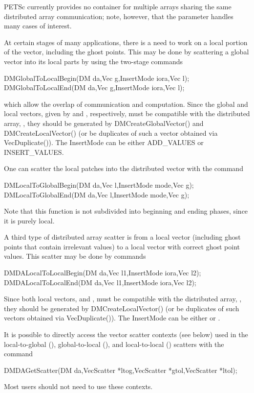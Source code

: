 PETSc currently provides no container for multiple arrays sharing the
same distributed array communication; note, however, that the 
parameter handles many cases of interest.

At certain stages of many applications, there is a need to work
on a local portion of the vector, including the ghost points.
This may be done by scattering a global vector into its
local parts by using the two-stage commands
\begin{tabbing}
  DMGlobalToLocalBegin(DM da,Vec g,InsertMode iora,Vec l);\\
  DMGlobalToLocalEnd(DM da,Vec g,InsertMode iora,Vec l);
\end{tabbing}
which allow the overlap of communication and computation.
Since the global and local vectors, given by  and , respectively,
must be compatible with the distributed array, , they should be
generated by DMCreateGlobalVector()
and DMCreateLocalVector()
(or be duplicates of such a vector obtained via VecDuplicate()).
The InsertMode can be either ADD\_VALUES or INSERT\_VALUES.

One can scatter the local patches into the distributed vector
with the command
\begin{tabbing}
  DMLocalToGlobalBegin(DM da,Vec l,InsertMode mode,Vec g);
  DMLocalToGlobalEnd(DM da,Vec l,InsertMode mode,Vec g);
\end{tabbing}
Note that this function is not
subdivided into beginning and ending phases, since it is purely local.

A third type of distributed array scatter is from a local
vector (including ghost points that contain irrelevant values) to
a local vector with correct ghost point values.
This scatter may be done by
commands
\begin{tabbing}
  DMDALocalToLocalBegin(DM da,Vec l1,InsertMode iora,Vec l2);\\
  DMDALocalToLocalEnd(DM da,Vec l1,InsertMode iora,Vec l2);
\end{tabbing}
Since both local vectors,  and ,
must be compatible with the distributed array, , they should be
generated by DMCreateLocalVector()
(or be duplicates of such vectors obtained via VecDuplicate()).
The InsertMode can be either  or .

It is possible to directly access the vector scatter contexts (see below)
used in the local-to-global (), global-to-local
(), and local-to-local ()
scatters with the command
\begin{tabbing}
  DMDAGetScatter(DM da,VecScatter *ltog,VecScatter *gtol,VecScatter *ltol);
\end{tabbing}
Most users should not need to use these contexts.

